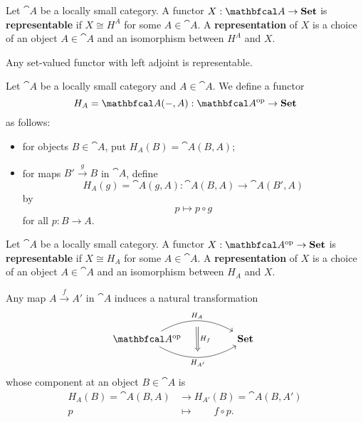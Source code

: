 \documentclass[11pt,a4paper]{article}
\begin{document}
\begin{definition}
    Let $\cat{A}$ be a locally small category. A functor $X:\cat{A}\to\bcat{Set}$ is \textbf{representable} if $X\cong H^A$ for some $A\in\cat{A}$. A \textbf{representation} of $X$ is a choice of an object $A\in\cat{A}$ and an isomorphism between $H^A$ and $X$.
\end{definition}

\begin{proposition}
    Any set-valued functor with left adjoint is representable.
\end{proposition}

\begin{definition}
    Let $\cat{A}$ be a locally small category and $A\in\cat{A}$. We define a functor
    \begin{equation*}
        H_A=\cat{A}(-,A): \catop{A}\to\bcat{Set}
    \end{equation*}
    as follows:
    \begin{itemize}
        \item for objects $B\in\cat{A}$, put $H_A(B)=\cat{A}(B,A)$;
        \item for maps $B'\xrightarrow{g}B$ in $\cat{A}$, define
            \begin{equation*}
                H_A(g)=\cat{A}(g,A): \cat{A}(B,A)\to\cat{A}(B',A)
            \end{equation*}
            by
            \begin{equation*}
                p\mapsto p\circ g
            \end{equation*}
            for all $p:B\to A$.
    \end{itemize}
\end{definition}

\begin{definition}
    Let $\cat{A}$ be a locally small category. A functor $X:\catop{A}\to\bcat{Set}$ is \textbf{representable} if $X\cong H_A$ for some $A\in\cat{A}$. A \textbf{representation} of $X$ is a choice of an object $A\in\cat{A}$ and an isomorphism between $H_A$ and $X$.
\end{definition}

Any map $A\xrightarrow{f}A'$ in $\cat{A}$ induces a natural transformation
\begin{equation*}
\begin{tikzcd}
    \catop{A}
    \arrow[rr, bend left=30, "H_A"{name=t}]
    \arrow[rr, bend right=30, "H_{A'}"'{name=b}]
    && \bcat{Set} \
    \arrow[from=t, Rightarrow, to=b, "H_f", shorten <= 6pt, shorten >= 6pt]
\end{tikzcd}
\end{equation*}
whose component at an object $B\in\cat{A}$ is 
\begin{align*}
    H_A(B)=\cat{A}(B,A) &\to H_{A'}(B)=\cat{A}(B,A')\\
    p\qquad &\mapsto\qquad f\circ p.
\end{align*}
\end{document}
